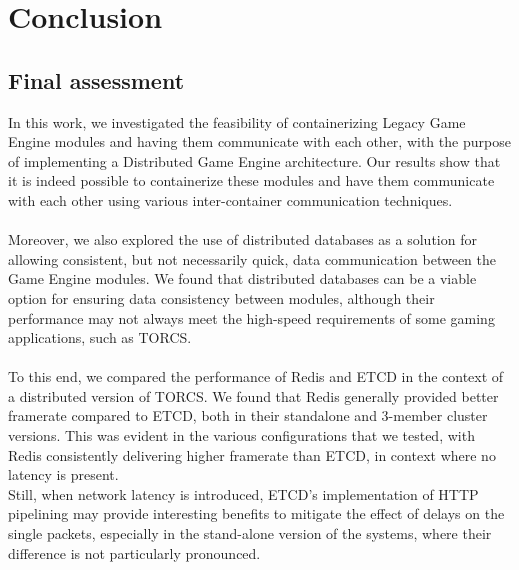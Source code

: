
\chapter{Conclusion}
\label{cap:conclusion}

\section{Final assessment}
In this work, we investigated the feasibility of containerizing Legacy Game Engine modules and having them communicate with each other, with the purpose of implementing a Distributed Game Engine architecture. Our results show that it is indeed possible to containerize these modules and have them communicate with each other using various inter-container communication techniques. \\ \\
Moreover, we also explored the use of distributed databases as a solution for allowing consistent, but not necessarily quick, data communication between the Game Engine modules. We found that distributed databases can be a viable option for ensuring data consistency between modules, although their performance may not always meet the high-speed requirements of some gaming applications, such as TORCS. \\ \\
To this end, we compared the performance of Redis and ETCD in the context of a distributed version of TORCS. We found that Redis generally provided better framerate compared to ETCD, both in their standalone and 3-member cluster versions. This was evident in the various configurations that we tested, with Redis consistently delivering higher framerate than ETCD, in context where no latency is present. \\
Still, when network latency is introduced, ETCD's implementation of HTTP pipelining may provide interesting benefits to mitigate the effect of delays on the single packets, especially in the stand-alone version of the systems, where their difference is not particularly pronounced. \\ \\

